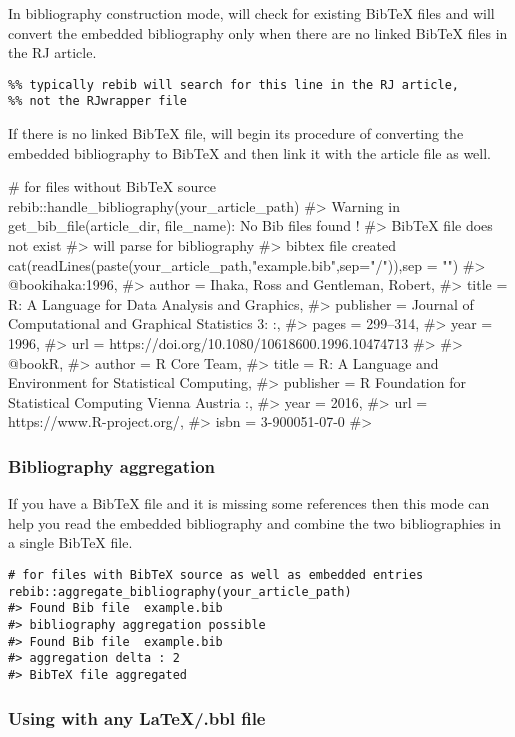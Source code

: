 In bibliography construction mode,  will check for existing BibTeX files and will convert the embedded bibliography only when there are no linked BibTeX files in the RJ article.
\begin{verbatim}
%% typically rebib will search for this line in the RJ article, 
%% not the RJwrapper file

\end{verbatim}
If there is no linked BibTeX file,  will begin its procedure of converting the embedded bibliography to BibTeX and then link it with the article file as well.
\begin{Schunk}
\begin{Sinput}
# for files without BibTeX source
rebib::handle_bibliography(your_article_path)
#> Warning in get_bib_file(article_dir, file_name): No Bib files found !
#> BibTeX file does not exist
#> will parse for bibliography
#> bibtex file created
cat(readLines(paste(your_article_path,"example.bib",sep="/")),sep = "\n")
#> @book{ihaka:1996,
#> author = {{Ihaka, Ross and Gentleman, Robert}},
#> title = {{R: A Language for Data Analysis and Graphics}},
#> publisher = {Journal of Computational and Graphical Statistics 3:   :},
#> pages = {299--314},
#> year = {1996},
#> url = {https://doi.org/10.1080/10618600.1996.10474713}
#> }
#> @book{R,
#> author = {R {Core Team}},
#> title = {{R: A Language and Environment for Statistical Computing}},
#> publisher = {R Foundation for Statistical Computing Vienna Austria    :},
#> year = {2016},
#> url = {https://www.R-project.org/},
#> isbn = {3-900051-07-0}
#> }
\end{Sinput}
\end{Schunk}

\subsubsection{Bibliography aggregation}

If you have a BibTeX file and it is missing some references then this mode can help you read the embedded bibliography and combine the two bibliographies in a single BibTeX file.
\begin{verbatim}
# for files with BibTeX source as well as embedded entries
rebib::aggregate_bibliography(your_article_path)
#> Found Bib file  example.bib
#> bibliography aggregation possible
#> Found Bib file  example.bib
#> aggregation delta : 2
#> BibTeX file aggregated
\end{verbatim}


\subsubsection{Using with any LaTeX/.bbl file}

